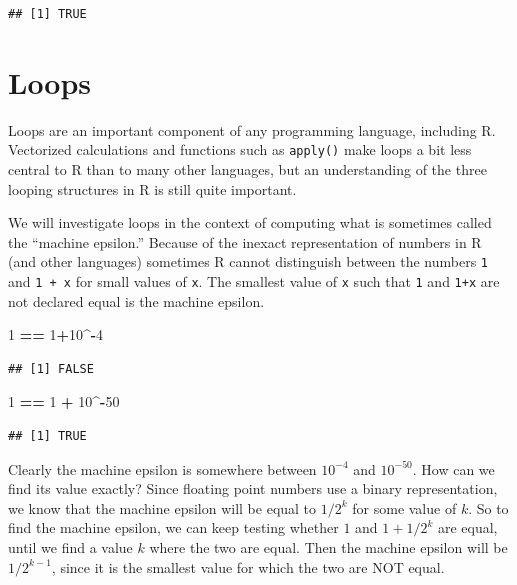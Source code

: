 \documentclass[
]{krantz}
\newenvironment{Shaded}{\begin{snugshade}}{\end{snugshade}}
\newcommand{\DecValTok}[1]{\textcolor[rgb]{0.00,0.00,0.81}{#1}}
\newcommand{\OperatorTok}[1]{\textcolor[rgb]{0.81,0.36,0.00}{\textbf{#1}}}
\newcommand{\StringTok}[1]{\textcolor[rgb]{0.31,0.60,0.02}{#1}}
\begin{document}
\begin{verbatim}
## [1] TRUE
\end{verbatim}

\hypertarget{loops}{%
\section{Loops}\label{loops}}

Loops are an important component of any programming language, including R. Vectorized calculations and functions such as \texttt{apply()} make loops a bit less central to R than to many other languages, but an understanding of the three looping structures in R is still quite important.

We will investigate loops in the context of computing what is sometimes called the ``machine epsilon.'' Because of the inexact representation of numbers in R (and other languages) sometimes R cannot distinguish between the numbers \texttt{1} and \texttt{\textbar{}1\ +\ x\textbar{}} for small values of \texttt{x}. The smallest value of \texttt{x} such that \texttt{1} and \texttt{\textbar{}1+x\textbar{}} are not declared equal is the machine epsilon.

\begin{Shaded}
\begin{Highlighting}[]
\DecValTok{1} \OperatorTok{==}\StringTok{ }\DecValTok{1}\OperatorTok{+}\DecValTok{10}\OperatorTok{\^{}{-}}\DecValTok{4}
\end{Highlighting}
\end{Shaded}

\begin{verbatim}
## [1] FALSE
\end{verbatim}

\begin{Shaded}
\begin{Highlighting}[]
\DecValTok{1} \OperatorTok{==}\StringTok{ }\DecValTok{1} \OperatorTok{+}\StringTok{ }\DecValTok{10}\OperatorTok{\^{}{-}}\DecValTok{50}
\end{Highlighting}
\end{Shaded}

\begin{verbatim}
## [1] TRUE
\end{verbatim}

Clearly the machine epsilon is somewhere between \(10^{-4}\) and \(10^{-50}\). How can we find its value exactly? Since floating point numbers use a binary representation, we know that the machine epsilon will be equal to \(1/2^k\) for some value of \(k\). So to find the machine epsilon, we can keep testing whether \(1\) and \(1+1/2^k\) are equal, until we find a value \(k\) where the two are equal. Then the machine epsilon will be \(1/2^{k-1}\), since it is the smallest value for which the two are NOT equal.
\end{document}
